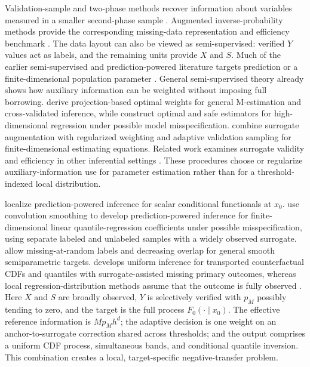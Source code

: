 Validation-sample and two-phase methods recover information about variables
measured in a smaller second-phase sample
\citep{Pepe1992,TaoZengLin2017}. Augmented inverse-probability methods provide
the corresponding missing-data representation and efficiency benchmark
\citep{RobinsRotnitzkyZhao1994,Tsiatis2006,CaoTsiatisDavidian2009}. The data
layout can also be viewed as semi-supervised: verified \(Y\) values act as
labels, and the remaining units provide \(X\) and \(S\). Much of the earlier
semi-supervised and prediction-powered literature targets prediction or a
finite-dimensional population parameter
\citep{ChakraborttyCai2018,ZhangBrownCai2019,AzrielEtAl2022,AngelopoulosEtAl2023,AngelopoulosDuchiZrnic2023,ZrnicCandes2024,LiIgnatiadis2025,MiaoEtAl2025}.
General semi-supervised theory already shows how auxiliary information can be
weighted without imposing full borrowing. \citet{SongLinZhou2024} derive
projection-based optimal weights for general M-estimation and cross-validated
inference, while \citet{DengEtAl2024} construct optimal and safe estimators for
high-dimensional regression under possible model misspecification.
\citet{ChenEtAl2025} combine surrogate augmentation with regularized weighting
and adaptive validation sampling for finite-dimensional estimating equations.
Related work examines surrogate validity and efficiency in other inferential
settings \citep{JiLeiZrnic2025,KallusMao2025}.
These procedures choose or regularize auxiliary-information use for parameter
estimation rather than for a threshold-indexed local distribution.

\citet{SuiEtAl2026} localize prediction-powered inference for scalar conditional functionals at
\(x_0\). \citet{TakeishiDingHe2026} use convolution smoothing to develop
prediction-powered inference for finite-dimensional linear quantile-regression
coefficients under possible misspecification, using separate labeled and
unlabeled samples with a widely observed surrogate. \citet{TestaEtAl2025}
allow missing-at-random labels and decreasing
overlap for general smooth semiparametric targets. \citet{Wang2026} develops
uniform inference for transported counterfactual CDFs and quantiles with
surrogate-assisted missing primary outcomes, whereas local
regression-distribution methods assume that the outcome is fully observed
\citep{CattaneoJanssonMa2024,CattaneoEtAl2024}. Here \(X\) and \(S\) are
broadly observed, \(Y\) is selectively verified with \(p_M\) possibly tending
to zero, and the target is the full process \(F_0(\cdot\mid x_0)\). The
effective reference information is \(Mp_Mh^d\); the adaptive decision is one
weight on an anchor-to-surrogate correction shared across thresholds; and the
output comprises a uniform CDF process, simultaneous bands, and conditional
quantile inversion. This combination creates a local, target-specific
negative-transfer problem.

